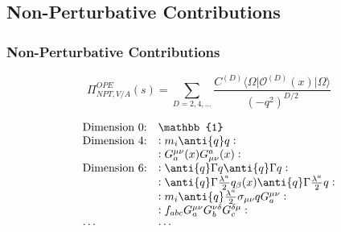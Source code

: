 \documentclass[fleqn]{beamer}
\begin{document}
\subsection{Non-Perturbative Contributions}
\begin{frame}
  \frametitle{Non-Perturbative Contributions}
  \begin{ceqn}
    \begin{equation}
      \Pi_{NPT, V/A}^{OPE}(s) = \sum_{D=2,4,\dots} \frac{C^{(D)}\langle \Omega \vert \mathcal{O}^{(D)} (x) \vert \Omega \rangle}{(-q^2)^{D/2}}
    \end{equation}
  \end{ceqn}
  \vfill
  \begin{ceqn}
    \begin{equation}
      \begin{array}{ll}
        \text{Dimension 0:} & \mathbb{1} \\
        \text{Dimension 4:} & :m_i \anti{q} q: \\
                            & :G_a^{\mu\nu}(x) G_{\mu\nu}^a(x): \\
        \text{Dimension 6:} & :\anti{q} \Gamma q \anti{q} \Gamma q: \\
                            & :\anti{q} \Gamma \frac{\lambda^a}{2} q_\beta(x) \anti{q} \Gamma \frac{\lambda^a}{2} q: \\
                            & :m_i \anti{q} \frac{\lambda^a}{2} \sigma_{\mu\nu} q G^{\mu\nu}_a: \\
                            & :f_{abc} G_a^{\mu\nu} G_b^{\nu\delta} G_c^{\delta\mu}: \\
        \cdots              & \cdots
      \end{array}
    \end{equation}
  \end{ceqn}
\end{frame}
\end{document}
